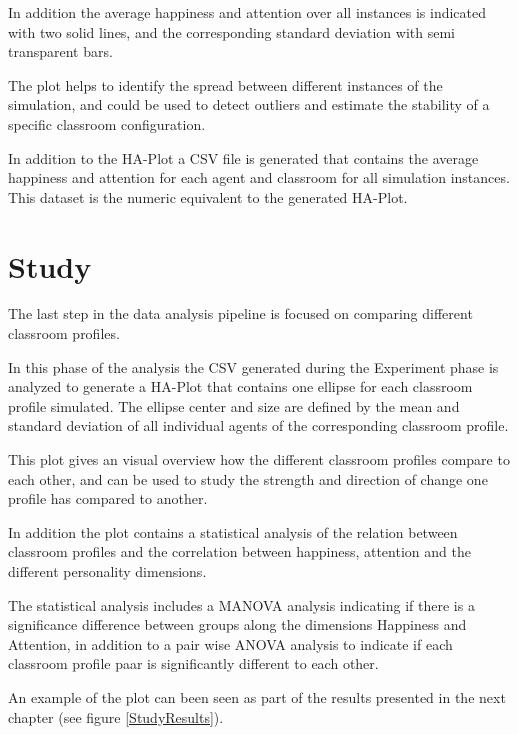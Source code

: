 In addition the average happiness and attention over all instances is
indicated with two solid lines, and the corresponding standard deviation with
semi transparent bars.

The plot helps to identify the spread between different instances of the simulation, and
could be used to detect outliers and estimate the stability of a specific classroom
configuration.

In addition to the HA-Plot a CSV file is generated that contains the average
happiness and attention for each agent and classroom for all simulation instances.
This dataset is the numeric equivalent to the generated HA-Plot.


\section{Study}

\begin{figure}[H]
\end{figure}


The last step in the data analysis pipeline is focused on comparing different classroom
profiles.

In this phase of the analysis the CSV generated during the Experiment phase is analyzed to
generate a HA-Plot that contains one ellipse for each classroom profile simulated.
The ellipse center and size are defined by the mean and standard deviation of all
individual agents of the corresponding classroom profile.

This plot gives an visual overview how the different classroom profiles
compare to each other, and can be used to study the strength and direction of
change one profile has compared to another.

In addition the plot contains a statistical analysis of the relation between
classroom profiles and the correlation between happiness, attention and the different
personality dimensions.

The statistical analysis includes a MANOVA analysis indicating if there is a
significance difference between groups along the dimensions Happiness and Attention,
in addition to a pair wise ANOVA analysis to indicate if each classroom profile
paar is significantly different to each other.

An example of the plot can been seen as part of the results presented in the next
chapter (see figure \ref{StudyResults}).
